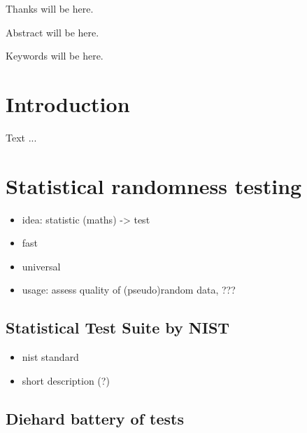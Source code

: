 \documentclass[12pt,oneside]{fithesis2}
\begin{document}
\FrontMatter
\ThesisTitlePage

\begin{ThesisDeclaration}
\DeclarationText
\AdvisorName
\end{ThesisDeclaration}

\begin{ThesisThanks}
Thanks will be here.
\end{ThesisThanks}

\begin{ThesisAbstract}
Abstract will be here.
\end{ThesisAbstract}

\begin{ThesisKeyWords}
Keywords will be here.
\end{ThesisKeyWords}

\MainMatter
\tableofcontents
\chapter{Introduction}
\label{chap:intro}
Text ...

\chapter{Statistical randomness testing}
\label{chap:stat-rand-testing}

\begin{itemize}
\item idea: statistic (maths) -> test
\item fast
\item universal
\item usage: assess quality of (pseudo)random data, ???
\end{itemize}

\section{Statistical Test Suite by NIST}
\label{sec:sts-nist}

\begin{itemize}
\item nist standard
\item short description (?)
\end{itemize}

\section{Diehard battery of tests}
\label{sec:diehard}
\end{document}

